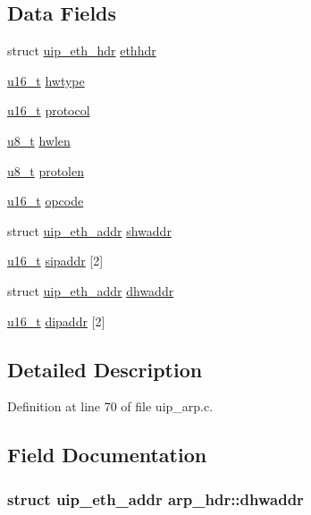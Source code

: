 \subsection*{Data Fields}
\begin{DoxyCompactItemize}
\item 
struct \hyperlink{structuip__eth__hdr}{uip\_\-eth\_\-hdr} \hyperlink{structarp__hdr_a68ea379da9c157e4cbc78fc8bc99b3e8}{ethhdr}
\item 
\hyperlink{group__uipfw_ga77570ac4fcab86864fa1916e55676da2}{u16\_\-t} \hyperlink{structarp__hdr_a537766d09520854ecc2371ad9156279b}{hwtype}
\item 
\hyperlink{group__uipfw_ga77570ac4fcab86864fa1916e55676da2}{u16\_\-t} \hyperlink{structarp__hdr_a17beac5fa18c23cef832a42772545023}{protocol}
\item 
\hyperlink{group__uipfw_ga4caecabca98b43919dd11be1c0d4cd8e}{u8\_\-t} \hyperlink{structarp__hdr_a9b432ff3eebf116a0e0e9bab7a1a71f0}{hwlen}
\item 
\hyperlink{group__uipfw_ga4caecabca98b43919dd11be1c0d4cd8e}{u8\_\-t} \hyperlink{structarp__hdr_a9e6708eb1418ec6d1bddd6478ff3878c}{protolen}
\item 
\hyperlink{group__uipfw_ga77570ac4fcab86864fa1916e55676da2}{u16\_\-t} \hyperlink{structarp__hdr_a195473a040b7bf59f59435f2e41a8864}{opcode}
\item 
struct \hyperlink{structuip__eth__addr}{uip\_\-eth\_\-addr} \hyperlink{structarp__hdr_a62e5377ce37cd7a2826bbb3866a340bb}{shwaddr}
\item 
\hyperlink{group__uipfw_ga77570ac4fcab86864fa1916e55676da2}{u16\_\-t} \hyperlink{structarp__hdr_a337c5b1cbd423f7d1a7a0420ced5e029}{sipaddr} \mbox{[}2\mbox{]}
\item 
struct \hyperlink{structuip__eth__addr}{uip\_\-eth\_\-addr} \hyperlink{structarp__hdr_ac4828237eff483dae60a21be71c40d49}{dhwaddr}
\item 
\hyperlink{group__uipfw_ga77570ac4fcab86864fa1916e55676da2}{u16\_\-t} \hyperlink{structarp__hdr_a63fdb5cc78ada39a43cbcbb654e8ae04}{dipaddr} \mbox{[}2\mbox{]}
\end{DoxyCompactItemize}


\subsection{Detailed Description}


Definition at line 70 of file uip\_\-arp.c.



\subsection{Field Documentation}
\hypertarget{structarp__hdr_ac4828237eff483dae60a21be71c40d49}{
\subsubsection[{dhwaddr}]{\setlength{\rightskip}{0pt plus 5cm}struct {\bf uip\_\-eth\_\-addr} {\bf arp\_\-hdr::dhwaddr}}}
\label{structarp__hdr_ac4828237eff483dae60a21be71c40d49}


